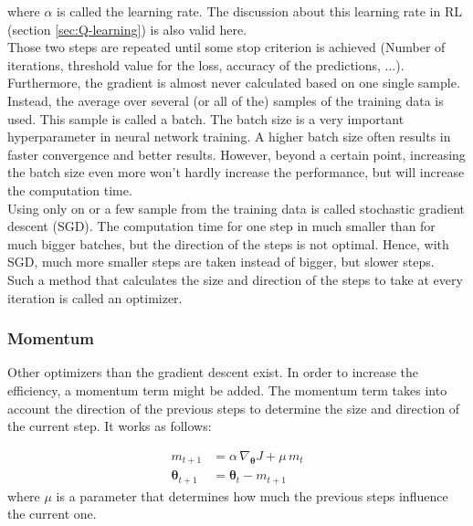 where $\alpha$ is called the learning rate. The discussion about this learning rate in RL (section \ref{sec:Q-learning}) is also valid here.\\

Those two steps are repeated until some stop criterion is achieved (Number of iterations, threshold value for the loss, accuracy of the predictions, ...). \\

Furthermore, the gradient is almost never calculated based on one single sample. Instead, the average over several (or all of the) samples of the training data is used. This sample is called a batch. The batch size is a very important hyperparameter in neural network training. A higher batch size often results in faster convergence and better results. However, beyond a certain point, increasing the batch size even more won't hardly increase the performance, but will increase the computation time.\\

Using only on or a few sample from the training data is called stochastic gradient descent (SGD). The computation time for one step in much smaller than for much bigger batches, but the direction of the steps is not optimal. Hence, with SGD, much more smaller steps are taken instead of bigger, but slower steps.\\

Such a method that calculates the size and direction of the steps to take at every iteration is called an optimizer.

\subsubsection{Momentum}

Other optimizers than the gradient descent exist. In order to increase the efficiency, a momentum term might be added. The momentum term takes into account the direction of the previous steps to determine the size and direction of the current step. It works as follows:

\begin{align} \label{eq:momentum}
    m_{t+1} &= \alpha\, \nabla_{\pmb{\theta}} J + \mu\, m_t\\
     \pmb{\theta}_{t+1} &= \pmb{\theta}_t - m_{t+1}
\end{align}
where $\mu$ is a parameter that determines how much the previous steps influence the current one.\\

